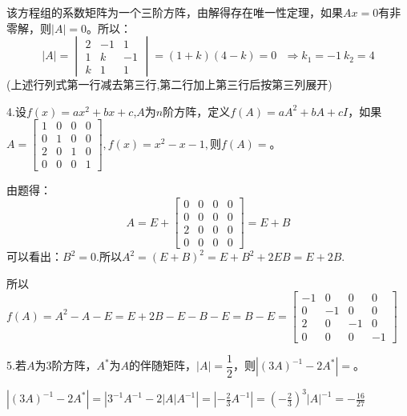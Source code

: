 \documentclass{article}
\begin{document}
\begin{jie}
该方程组的系数矩阵为一个三阶方阵，由解得存在唯一性定理，如果$Ax=0$有非零解，则$|A|=0$。所以：
\begin{equation*}
|A|=
\begin{vmatrix}
2 & -1 & 1 \\
1 & k &-1\\
k & 1 & 1
\end{vmatrix}=(1+k)(4-k)=0~~~\Rightarrow k_{1}=-1 ~k_{2}=4
\end{equation*}
(上述行列式第一行减去第三行,第二行加上第三行后按第三列展开)
\end{jie}

4.设$f(x)=ax^{2}+bx+c$,$A$为$n$阶方阵，定义$f(A)=aA^{2}+bA+cI$，如果$
A=
\begin{bmatrix}
  1 & 0 & 0 & 0 \\
  0 & 1& 0& 0 \\
  2 & 0 & 1& 0\\
   0 & 0 &0 &1
\end{bmatrix},f(x)=x^{2}-x-1,
$则$f(A)=$\underline{\hphantom{~~~~~~~~~~}}。

\begin{jie}
由题得：
\begin{equation*}
A=E+\begin{bmatrix}
  0 & 0 & 0 & 0 \\
  0 & 0& 0& 0 \\
  2 & 0 & 0& 0\\
   0 & 0 &0 &0
\end{bmatrix}=E+B
\end{equation*}
可以看出：$B^2=0$.所以$A^2=(E+B)^2=E+B^2+2EB=E+2B$.

所以$f(A)=A^2-A-E=E+2B-E-B-E=B-E=
\begin{bmatrix}
  -1 & 0 & 0 & 0 \\
  0 & -1& 0& 0 \\
  2 & 0 & -1& 0\\
   0 & 0 &0 &-1
\end{bmatrix}
$
\end{jie}

5.若$A$为3阶方阵，$A^{*}$为$A$的伴随矩阵，$|A|=\dfrac{1}{2}$，则$\left|(3A)^{-1}-2A^{*}\right|=$\underline{\hphantom{~~~~~~~~~~}}。

\begin{jie}
$\left|(3A)^{-1}-2A^{*}\right|=\left|3^{-1}A^{-1}-2|A|A^{-1}\right|=\left|-\frac{2}{3}A^{-1}\right|=\left(-\frac{2}{3}\right)^{3}|A|^{-1}=-\frac{16}{27}$
\end{jie}
\end{document}
